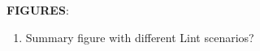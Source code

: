 \textbf{FIGURES}:
\begin{enumerate}
\item Summary figure with different Lint scenarios?
\end{enumerate}
